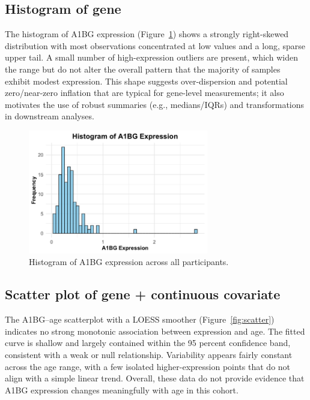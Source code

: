 \documentclass[11pt]{article}
\begin{document}
\subsection{Histogram of gene}
The histogram of A1BG expression (Figure~\ref{fig:hist}) shows a strongly right-skewed distribution with most observations concentrated at low values and a long, sparse upper tail. A small number of high-expression outliers are present, which widen the range but do not alter the overall pattern that the majority of samples exhibit modest expression. This shape suggests over-dispersion and potential zero/near-zero inflation that are typical for gene-level measurements; it also motivates the use of robust summaries (e.g., medians/IQRs) and transformations in downstream analyses.

\begin{figure}[H]
\centering
\includegraphics[width=0.7\textwidth]{fig1_hist.png}
\caption{Histogram of A1BG expression across all participants.}
\label{fig:hist}
\end{figure}

\newpage
\subsection{Scatter plot of gene + continuous covariate}
The A1BG–age scatterplot with a LOESS smoother (Figure~\ref{fig:scatter}) indicates no strong monotonic association between expression and age. The fitted curve is shallow and largely contained within the 95 percent confidence band, consistent with a weak or null relationship. Variability appears fairly constant across the age range, with a few isolated higher-expression points that do not align with a simple linear trend. Overall, these data do not provide evidence that A1BG expression changes meaningfully with age in this cohort.
\end{document}
